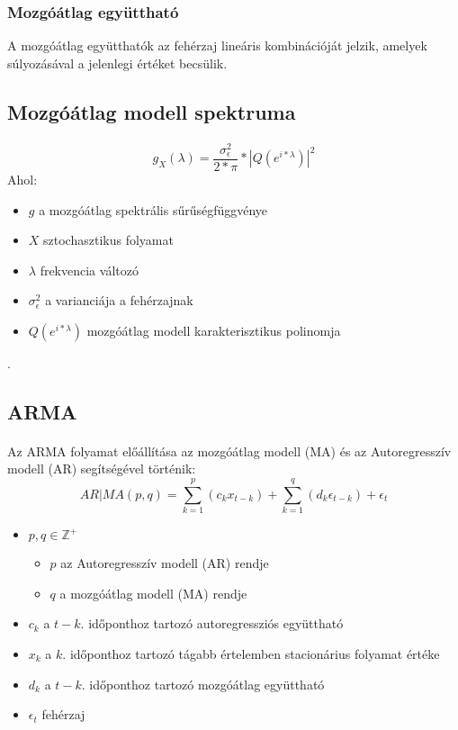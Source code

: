 \documentclass[11pt,a4paper]{article}
\begin{document}
					\subsubsection{Mozgóátlag együttható}
						A mozgóátlag együtthatók az fehérzaj lineáris kombinációját jelzik, amelyek súlyozásával a jelenlegi értéket becsülik.
					\subsection{Mozgóátlag modell spektruma}
						\paragraph{}
							$$g_X(\lambda) = \dfrac{\sigma^2_\epsilon}{2*\pi}*|Q(e^{i*\lambda})|^2$$
							Ahol:
							\begin{itemize}
								\item $g$ a mozgóátlag spektrális sűrűségfüggvénye
								\item $X$ sztochasztikus folyamat
								\item $\lambda$ frekvencia változó
								\item $\sigma^2_\epsilon$ a varianciája a fehérzajnak
								\item $Q(e^{i*\lambda})$ mozgóátlag modell karakterisztikus polinomja
							\end{itemize}.
				\subsection{ARMA}
					\paragraph{}
						Az ARMA folyamat előállítása az mozgóátlag modell (MA) és az Autoregresszív modell (AR) segítségével történik:
						$$AR|MA(p,q) = \sum_{k = 1}^p (c_k x_{t-k}) + \sum_{k=1}^q(d_k \epsilon_{t-k}) + \epsilon_t$$
						\begin{itemize}
							\item $p,q \in \mathbb{Z}^+$
							\begin{itemize}
								\item $p$ az Autoregresszív modell (AR) rendje
								\item $q$ a mozgóátlag modell (MA) rendje
							\end{itemize}
							\item $c_k$ a $t-k.$ időponthoz tartozó autoregressziós együttható
							\item $x_k$ a $k.$ időponthoz tartozó tágabb értelemben stacionárius folyamat értéke
							\item $d_k$ a $t-k.$ időponthoz tartozó mozgóátlag együttható
							\item $\epsilon_t$ fehérzaj
						\end{itemize}
\end{document}
